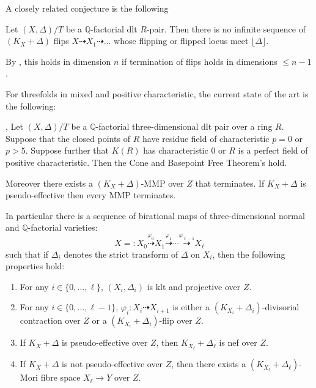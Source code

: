A closely related conjecture is the following

\begin{conjecture}
	
	Let $(X,\Delta)/T$ be a $\mathbb{Q}$-factorial dlt $R$-pair. Then there is no infinite sequence of $(K_{X}+\Delta)$ flips $X \dashrightarrow X_{1} \dashrightarrow ...$ whose flipping or flipped locus meet $\lfloor \Delta \rfloor$.
	
\end{conjecture}

By \cite[4.2.1]{fujino2007special}, this holds in dimension $n$ if termination of flips holds in dimensions $\leq n-1$.

For threefolds in mixed and positive characteristic, the current state of the art is the following:

	\begin{theorem}\cite[Theorem 1.7]{BW17}, \cite[Theorem 1.2]{BW17}\cite[Theorem F]{bhatt2020}\label{MMP}
	Let $(X, \Delta)/T$ be a $\mathbb{Q}$-factorial three-dimensional dlt pair over a ring $R$. Suppose that the closed points of $R$ have residue field of characteristic $p=0$ or $p> 5$. Suppose further that $K(R)$ has characteristic $0$ or $R$ is a perfect field of positive characteristic. Then the Cone and Basepoint Free Theorem's hold.
	
	Moreover there exists a $(K_X+\Delta)$-MMP over $Z$ that terminates. If $K_{X}+\Delta$ is pseudo-effective then every MMP terminates. 
	
	In particular there is a sequence of birational maps of three-dimensional normal and $\mathbb{Q}$-factorial varieties:  
	\[
	X=:X_0 \overset{\varphi_0}{\dashrightarrow} X_1 \overset{\varphi_1}{\dashrightarrow} \cdots \overset{\varphi_{\ell-1}}{\dashrightarrow} X_{\ell}
	\]
	such that if $\Delta_i$ denotes the strict transform of $\Delta$ on $X_i$, then
	the following properties hold:  
	\begin{enumerate}
		\item 
		For any $i \in \{0, \ldots, \ell\}$, 
		$(X_i, \Delta_i)$ is klt and projective over $Z$.
		\item 
		For any $i \in \{0, \ldots, \ell-1\}$, 
		$\varphi_i\colon X_i \dashrightarrow X_{i+1}$ is either a $(K_{X_i}+\Delta_i)$-divisorial contraction over $Z$ or a $(K_{X_i}+\Delta_i)$-flip over $Z$. 
		\item 
		If $K_X+\Delta$ is pseudo-effective over $Z$, then $K_{X_{\ell}}+\Delta_{\ell}$ is nef over $Z$. 
		\item 
		If $K_X+\Delta$ is not pseudo-effective over $Z$, then 
		there exists a $(K_{X_{\ell}}+\Delta_{\ell})$-Mori fibre space $X_{\ell} \to Y$ over $Z$. 
	\end{enumerate}
\end{theorem}

